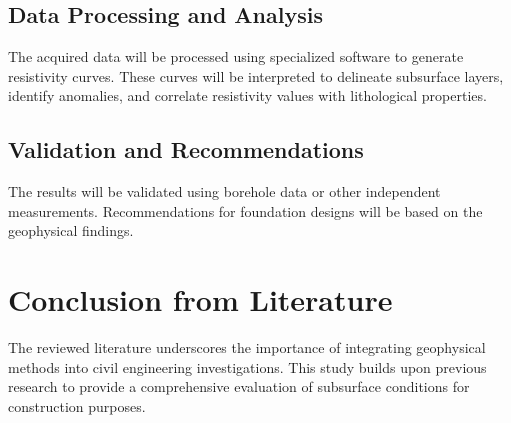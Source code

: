 \documentclass[12pt,a4paper]{report}
\begin{document}
\subsection{Data Processing and Analysis}
The acquired data will be processed using specialized software to generate resistivity curves. These curves will be interpreted to delineate subsurface layers, identify anomalies, and correlate resistivity values with lithological properties.

\subsection{Validation and Recommendations}
The results will be validated using borehole data or other independent measurements. Recommendations for foundation designs will be based on the geophysical findings.

\section{Conclusion from Literature}
The reviewed literature underscores the importance of integrating geophysical methods into civil engineering investigations. This study builds upon previous research to provide a comprehensive evaluation of subsurface conditions for construction purposes.
\end{document}
